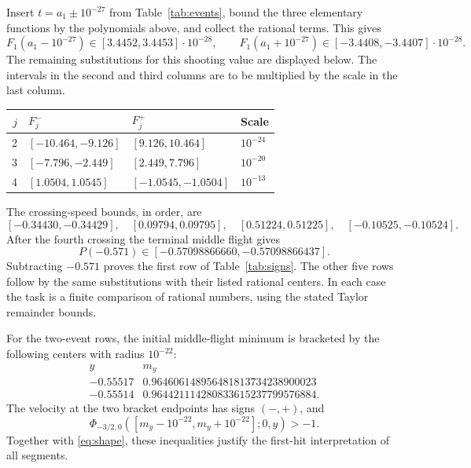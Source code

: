 \documentclass[11pt,a4paper]{article}
\begin{document}
Insert $t=a_1\pm10^{-27}$ from Table~\ref{tab:events}, bound the
three elementary functions by the polynomials above, and collect the
rational terms. This gives
\[
 F_1(a_1-10^{-27})\in[3.4452,3.4453]\cdot10^{-28},\qquad
 F_1(a_1+10^{-27})\in[-3.4408,-3.4407]\cdot10^{-28}.
\]
The remaining substitutions for this shooting value are displayed below.
The intervals in the second and third columns are to be multiplied by
the scale in the last column.
\begin{center}
\begin{tabular}{@{}rlll@{}}\toprule
$j$ & $F_j^-$ & $F_j^+$ & Scale\\\midrule
2 & $[-10.464,-9.126]$ & $[9.126,10.464]$ & $10^{-24}$\\
3 & $[-7.796,-2.449]$ & $[2.449,7.796]$ & $10^{-20}$\\
4 & $[1.0504,1.0545]$ & $[-1.0545,-1.0504]$ & $10^{-13}$\\\bottomrule
\end{tabular}
\end{center}
The crossing-speed bounds, in order, are
\[
 [-0.34430,-0.34429],\quad[0.09794,0.09795],\quad
 [0.51224,0.51225],\quad[-0.10525,-0.10524].
\]
After the fourth crossing the terminal middle flight gives
\[
 P(-0.571)\in[-0.57098866660,-0.57098866437].
\]
Subtracting $-0.571$ proves the first row of Table~\ref{tab:signs}.
The other five rows follow by the same substitutions with their listed
rational centers. In each case the task is a finite comparison of
rational numbers, using the stated Taylor remainder bounds.

For the two-event rows, the initial middle-flight minimum is bracketed
by the following centers with radius $10^{-22}$:
\[
\begin{array}{c|l}
y&m_y\\\hline
-0.55517&0.964606148956481813734238900023\\
-0.55514&0.964421114280833615237799576884.
\end{array}
\]
The velocity at the two bracket endpoints has signs $(-,+)$, and
\[
 \Phi_{-3/2,0}([m_y-10^{-22},m_y+10^{-22}];0,y)>-1.
\]
Together with \eqref{eq:shape}, these inequalities justify the first-hit
interpretation of all segments.
\end{document}
